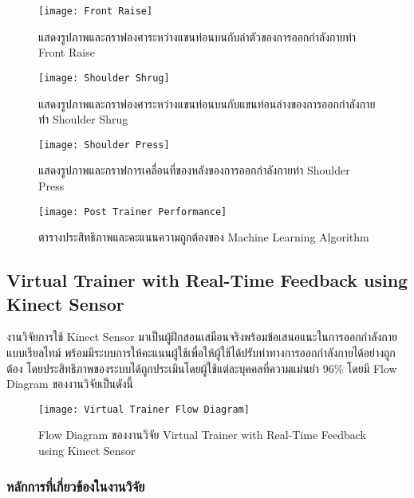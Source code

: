 \begin{figure}
    \texttt{[image: Front Raise]}
    \caption{แสดงรูปภาพและกราฟองศาระหว่างแขนท่อนบนกับลำตัวของการออกกำลังกายท่า Front Raise}
\end{figure}

\begin{figure}
    \texttt{[image: Shoulder Shrug]}
    \caption{แสดงรูปภาพและกราฟองศาระหว่างแขนท่อนบนกับแขนท่อนล่างของการออกกำลังกายท่า Shoulder Shrug}
\end{figure}

\begin{figure}
    \texttt{[image: Shoulder Press]}
    \caption{แสดงรูปภาพและกราฟการเคลื่อนที่ของหลังของการออกกำลังกายท่า Shoulder Press}
\end{figure}

\begin{figure}
    \texttt{[image: Post Trainer Performance]}
    \caption{ตารางประสิทธิภาพและคะแนนความถูกต้องของ Machine Learning Algorithm}
\end{figure}

\subsection{Virtual Trainer with Real-Time Feedback using Kinect Sensor}
งานวิจัยการใช้ Kinect Sensor มาเป็นผู้ฝึกสอนเสมือนจริงพร้อมข้อเสนอแนะในการออกกำลังกายแบบเรียลไทม์
พร้อมมีระบบการให้คะแนนผู้ใช้เพื่อให้ผู้ใช้ได้ปรับท่าทางการออกกำลังกายได้อย่างถูกต้อง
โดยประสิทธิภาพของระบบได้ถูกประเมินโดยผู้ใช้แต่ละบุคคลที่ความแม่นยำ 96\%
โดยมี Flow Diagram ของงานวิจัยเป็นดังนี้


\begin{figure}
    \texttt{[image: Virtual Trainer Flow Diagram]}
    \caption{Flow Diagram ของงานวิจัย Virtual Trainer with Real-Time Feedback using Kinect Sensor}
\end{figure}

\subsubsection{หลักการที่เกี่ยวข้องในงานวิจัย}

